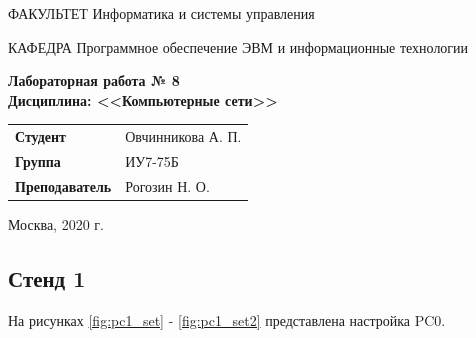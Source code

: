 \documentclass[a4paper,14pt]{article}
\begin{document}
\begin{titlepage}
    \begin{flushleft}
        ФАКУЛЬТЕТ Информатика и системы управления
    \end{flushleft}
    КАФЕДРА Программное обеспечение ЭВМ и информационные технологии

    \vspace{3cm}

    \begin{center}
        \textbf{Лабораторная работа № 8} \\
        \textbf{Дисциплина: <<Компьютерные сети>>}
        \vspace{0.5cm}
    \end{center}


    \vspace{3cm}

    \begin{flushleft}
        \begin{tabular}{ll}
            \textbf{Студент}       & Овчинникова А. П. \\
            \textbf{Группа}        & ИУ7-75Б           \\
            \textbf{Преподаватель} & Рогозин Н. О.     \\
        \end{tabular}
    \end{flushleft}

    \vspace{3cm}

    \begin{center}
        Москва, 2020 г.
    \end{center}

\end{titlepage}

\setcounter{page}{2}

\subsection*{Стенд 1}

На рисунках \ref{fig:pc1_set} - \ref{fig:pc1_set2} представлена настройка PC0.
\end{document}

